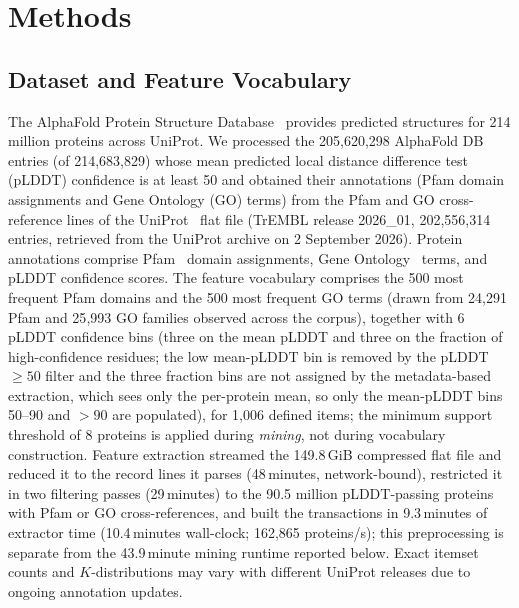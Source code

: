 \documentclass[10pt,a4paper,twocolumn]{article}
\begin{document}
\section{Methods}
\label{sec:methods}

\subsection{Dataset and Feature Vocabulary}

The AlphaFold Protein Structure Database~\cite{varadi2024} provides predicted structures for 214 million proteins across UniProt. We processed the 205,620,298 AlphaFold DB entries (of 214,683,829) whose mean predicted local distance difference test (pLDDT) confidence is at least 50 and obtained their annotations (Pfam domain assignments and Gene Ontology (GO) terms) from the Pfam and GO cross-reference lines of the UniProt~\cite{uniprot2023} flat file (TrEMBL release 2026\_01, 202,556,314 entries, retrieved from the UniProt archive on 2 September 2026). Protein annotations comprise Pfam~\cite{mistry2021} domain assignments, Gene Ontology~\cite{go2023} terms, and pLDDT confidence scores. The feature vocabulary comprises the 500 most frequent Pfam domains and the 500 most frequent GO terms (drawn from 24{,}291 Pfam and 25{,}993 GO families observed across the corpus), together with 6 pLDDT confidence bins (three on the mean pLDDT and three on the fraction of high-confidence residues; the low mean-pLDDT bin is removed by the pLDDT${\geq}50$ filter and the three fraction bins are not assigned by the metadata-based extraction, which sees only the per-protein mean, so only the mean-pLDDT bins 50--90 and ${>}90$ are populated), for 1{,}006 defined items; the minimum support threshold of 8 proteins is applied during \emph{mining}, not during vocabulary construction. Feature extraction streamed the 149.8\,GiB compressed flat file and reduced it to the record lines it parses (48\,minutes, network-bound), restricted it in two filtering passes (29\,minutes) to the 90.5 million pLDDT-passing proteins with Pfam or GO cross-references, and built the transactions in 9.3\,minutes of extractor time (10.4\,minutes wall-clock; 162,865 proteins/s); this preprocessing is separate from the 43.9\,minute mining runtime reported below. Exact itemset counts and $K$-distributions may vary with different UniProt releases due to ongoing annotation updates.
\end{document}
